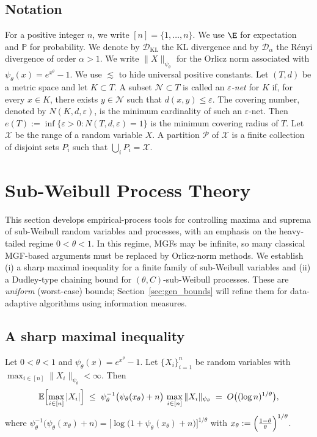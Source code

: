 \documentclass[11pt]{article}
\providecommand{\DD}{\mathcal{D}}
\begin{document}
\subsection*{Notation}
For a positive integer $n$, we write $[n]=\{1,\ldots,n\}$. We use $\E$ for
expectation and $\mathbb{P}$ for probability. We denote by $\DD_{\mathrm{KL}}$
the KL divergence and by $\DD_\alpha$ the R\'enyi divergence of order $\alpha>1$.
We write $\|X\|_{\psi_\theta}$ for the Orlicz norm associated with
$\psi_\theta(x)=e^{x^\theta}-1$.  We use $\lesssim$ to hide universal positive
constants. Let $(T, d)$ be a metric space and let $K \subset T$.  A subset $\mathcal{N} \subset T$ is called an \textit{$\varepsilon$-net} for $K$ if, for every $x \in K$, 
there exists $y \in \mathcal{N}$ such that $d(x, y) \leq \varepsilon$. The {covering number}, denoted by $N(K, d, \varepsilon)$,  is the minimum cardinality of such an $\varepsilon$-net. Then $e(T):=\inf\{\varepsilon>0: N(T,d,\varepsilon)=1\}$ is the minimum covering radius of $T$. 
Let $\mathcal{X}$ be the range of a random variable $X$. A partition $\mathcal{P}$ of $\mathcal{X}$ is a finite collection of disjoint sets $P_i$ such that \(\bigcup_i P_i = \mathcal{X}\).


\section{Sub-Weibull Process Theory}\label{sec:ep}

This section develops empirical-process tools for controlling maxima and
suprema of sub-Weibull random variables and processes, with an emphasis on the
heavy-tailed regime $0<\theta<1$.  In this regime, MGFs may be infinite, so many classical MGF-based arguments must be replaced
by Orlicz-norm methods.  We establish (i) a sharp maximal inequality for a
finite family of sub-Weibull variables and (ii) a Dudley-type chaining bound
for $(\theta,C)$-sub-Weibull processes.  These are \emph{uniform} (worst-case)
bounds; Section~\ref{sec:gen_bounds} will refine them for data-adaptive
algorithms using information measures.

\subsection{A sharp maximal inequality}

\begin{lemma}\label{pp-MaximalSW}
Let $0<\theta<1$ and $\psi_\theta(x)=e^{x^\theta}-1$. Let $\{X_i\}_{i=1}^n$ be random variables with
\(
\max_{i\in [n]}\|X_i\|_{\psi_\theta}<\infty.
\)
Then
\begin{equation}\label{eq:MaximalSW}
\mathbb{E}\Bigl[\max_{i\in [n]}|X_i|\Bigr]
\;\le\;
\psi_\theta^{-1}\bigl(\psi_\theta(x_\theta)+n\bigr)\,
\max_{i\in [n]}\|X_i\|_{\psi_\theta}
\;=\;O\bigl((\log n)^{1/\theta}\bigr),
\end{equation}
where $
\psi_\theta^{-1}\bigl(\psi_\theta(x_\theta)+n\bigr)
=\bigl[\log\bigl(1+\psi_\theta(x_\theta)+n\bigr)\bigr]^{1/\theta}$ with $x_\theta:=\Bigl(\frac{1-\theta}{\theta}\Bigr)^{1/\theta}$.
\end{lemma}
\end{document}
